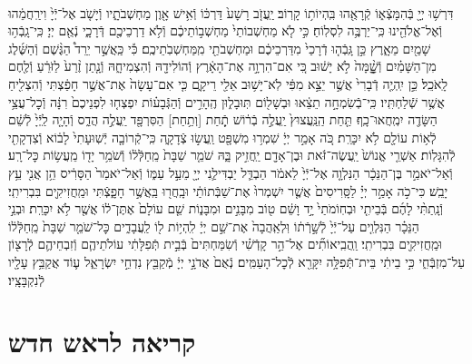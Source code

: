 \documentclass[twoside, openany, parskip=half, 11pt]{book}
\begin{document}
\begin{footnotesize}
\begin{multicols}{2}
\\
דִּרְשׁ֥וּ יְיָ֖ בְּֿהִמָּצְֿא֑וֹ קְֿרָאֻ֖הוּ בִּֽהְיוֹת֥וֹ קָרֽוֹב׃ יַֽעֲזֹ֤ב רָשָׁע֙ דַּרְכּ֔וֹ וְֿאִ֥ישׁ אָ֖וֶן מַחְשְׁבֹתָ֑יו וְֿיָשֹׁ֤ב אֶל־יְֿיָ֙ וִירַֽחֲמֵ֔הוּ וְֿאֶל־אֱלֹהֵ֖ינוּ כִּֽי־יַרְבֶּ֥ה לִסְלֽוֹחַ׃ כִּ֣י לֹ֤א מַחְשְׁבוֹתַי֙ מַחְשְׁב֣וֹתֵיכֶ֔ם וְֿלֹ֥א דַרְכֵיכֶ֖ם דְּֿרָכָ֑י נְֿאֻ֖ם יְיָ׃ כִּֽי־גָֽבְֿה֥וּ שָׁמַ֖יִם מֵאָ֑רֶץ כֵּ֣ן גָּֽבְֿה֤וּ דְֿרָכַי֙ מִדַּרְכֵיכֶ֔ם וּמַחְשְׁבֹתַ֖י מִֽמַּחְשְׁבֹֽתֵיכֶֽם׃ כִּ֡י כַּֽאֲשֶׁ֣ר יֵרֵד֩ הַגֶּ֨שֶׁם וְֿהַשֶּׁ֜לֶג מִן־הַשָּׁמַ֗יִם וְֿשׇׇׇׇָׁ֨מָּה֙ לֹ֣א יָשׁ֔וּב כִּ֚י אִם־הִרְוָ֣ה אֶת־הָאָ֔רֶץ וְֿהוֹלִידָ֖הּ וְֿהִצְמִיחָ֑הּ וְֿנָ֤תַן זֶ֨רַע֙ לַזֹּרֵ֔עַ וְֿלֶ֖חֶם לָֽאֹכֵֽל׃ כֵּ֣ן יִֽהְיֶ֤ה דְֿבָרִי֙ אֲשֶׁ֣ר יֵצֵ֣א מִפִּ֔י לֹֽא־יָשׁ֥וּב אֵלַ֖י רֵיקָ֑ם כִּ֤י אִם־עָשָׂה֙ אֶת־אֲשֶׁ֣ר חָפַ֔צְתִּי וְֿהִצְלִ֖יחַ אֲשֶׁ֥ר שְֿׁלַחְתִּֽיו׃ כִּֽי־בְֿשִׂמְחָ֣ה תֵצֵ֔אוּ וּבְשָׁל֖וֹם תּֽוּבָל֑וּן הֶֽהָרִ֣ים וְֿהַגְּֿבָע֗וֹת יִפְצְח֤וּ לִפְנֵיכֶם֙ רִנָּ֔ה וְֿכׇל־עֲצֵ֥י הַשָּׂדֶ֖ה יִמְֽחֲאוּ־כָֽף׃ תַּ֤חַת הַֽנַּֽעֲצוּץ֙ יַֽעֲלֶ֣ה בְֿר֔וֹשׁ תְַֿ֥חַת [וְתַ֥חַת] הַסִּרְפָּ֖ד יַֽעֲלֶ֣ה הֲדַ֑ס וְֿהָיָ֤ה לַֽיְֿיָ֙ לְֿשֵׁ֔ם לְֿא֥וֹת עוֹלָ֖ם לֹ֥א יִכָּרֵֽת׃ כֹּ֚ה אָמַ֣ר יְיָ֔ שִׁמְר֥וּ מִשְׁפָּ֖ט וַֽעֲשׂ֣וּ צְֿדָקָ֑ה כִּֽי־קְֿרוֹבָ֤ה יְֿשֽׁוּעָתִי֙ לָב֔וֹא וְֿצִדְקָתִ֖י לְֿהִגָּלֽוֹת׃ אַשְׁרֵ֤י אֱנוֹשׁ֙ יַֽעֲשֶׂה־זֹּ֔את וּבֶן־אָדָ֖ם יַֽחֲזִ֣יק בָּ֑הּ שֹׁמֵ֤ר שַׁבָּת֙ מֵֽחַלְּֿל֔וֹ וְֿשֹׁמֵ֥ר יָד֖וֹ מֵֽעֲשׂ֥וֹת כׇּל־רָֽע׃ וְֿאַל־יֹאמַ֣ר בֶּן־הַנֵּכָ֔ר הַנִּלְוָ֤ה אֶל־יְֿיָ֙ לֵאמֹ֔ר הַבְדֵּ֧ל יַבְדִּילַ֛נִי יְיָ֖ מֵעַ֣ל עַמּ֑וֹ וְֿאַל־יֹאמַר֙ הַסָּרִ֔יס הֵ֥ן אֲנִ֖י עֵ֥ץ יָבֵֽשׁ׃ כִּי־כֹ֣ה אָמַ֣ר יְיָ֗ לַסָּֽרִיסִים֙ אֲשֶׁ֤ר יִשְׁמְרוּ֙ אֶת־שַׁבְּֿתוֹתַ֔י וּבָֽחֲר֖וּ בַּֽאֲשֶׁ֣ר חָפָ֑צְֿתִּי וּמַֽחֲזִיקִ֖ים בִּבְרִיתִֽי׃ וְֿנָֽתַתִּ֨י לָהֶ֜ם בְּֿבֵיתִ֤י וּבְחֽוֹמֹתַי֙ יָ֣ד וָשֵׁ֔ם ט֖וֹב מִבָּנִ֣ים וּמִבָּנ֑וֹת שֵׁ֤ם עוֹלָם֙ אֶתֶּן־ל֔וֹ אֲשֶׁ֖ר לֹ֥א יִכָּרֵֽת׃ וּבְנֵ֣י הַנֵּכָ֗ר הַנִּלְוִ֤ים עַל־יְֿיָ֙ לְֿשָׁ֣רְֿת֔וֹ וּֽלְאַֽהֲבָה֙ אֶת־שֵׁ֣ם יְיָ֔ לִֽהְי֥וֹת ל֖וֹ לַֽעֲבָדִ֑ים כׇּל־שֹׁמֵ֤ר שַׁבָּת֙ מֵֽחַלְּֿל֔וֹ וּמַֽחֲזִיקִ֖ים בִּבְרִיתִֽי׃ וַֽהֲבִֽיאוֹתִ֞ים אֶל־הַ֣ר קָדְֿשִׁ֗י וְֿשִׂמַּחְתִּים֙ בְּֿבֵ֣ית תְּֿפִלָּתִ֔י עוֹלֹתֵיהֶ֧ם וְֿזִבְחֵיהֶ֛ם לְֿרָצ֖וֹן עַל־מִזְבְּֿחִ֑י כִּ֣י בֵיתִ֔י בֵּית־תְּֿפִלָּ֥ה יִקָּרֵ֖א לְֿכׇל־הָעַמִּֽים׃ נְֿאֻם֙ אֲדֹנָ֣י יְיָ֔ מְֿקַבֵּ֖ץ נִדְחֵ֣י יִשְׂרָאֵ֑ל ע֛וֹד אֲקַבֵּ֥ץ עָלָ֖יו לְֿנִקְבָּצָֽיו׃

\end{multicols}

\section[ראש חדש]{קריאה לראש חדש}



\end{footnotesize}
\end{document}
